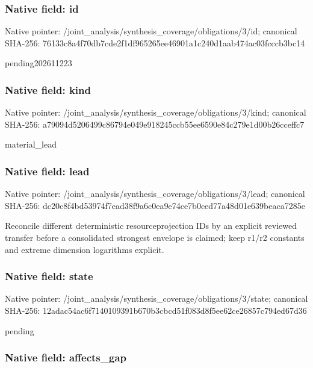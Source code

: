 \documentclass[10pt,a4paper]{article}
\begin{document}
\subsubsection{Native field: id}


Native pointer: /joint\_analysis/synthesi\allowbreak{}s\_coverage/obligations/3\allowbreak{}/id; canonical SHA-256: 76133c8a4f70db7cde2f1df9\allowbreak{}65265ee46901a1c240d1aab4\allowbreak{}74ac03fcccb3bc14


pending202611223


\subsubsection{Native field: kind}


Native pointer: /joint\_analysis/synthesi\allowbreak{}s\_coverage/obligations/3\allowbreak{}/kind; canonical SHA-256: a79094d5206499c86794e049\allowbreak{}e918245ccb55ee6590e84c27\allowbreak{}9e1d00b26cceffc7


material\_lead


\subsubsection{Native field: lead}


Native pointer: /joint\_analysis/synthesi\allowbreak{}s\_coverage/obligations/3\allowbreak{}/lead; canonical SHA-256: dc20c8f4bd53974f7ead38f9\allowbreak{}a6c0ea9e74ce7b0ced77a48d\allowbreak{}01e639beaca7285e


Reconcile different deterministic resourceprojection IDs by an explicit reviewed transfer before a consolidated strongest envelope is claimed; keep r1/r2 constants and extreme dimension logarithms explicit.


\subsubsection{Native field: state}


Native pointer: /joint\_analysis/synthesi\allowbreak{}s\_coverage/obligations/3\allowbreak{}/state; canonical SHA-256: 12adac54ac6f7140109391b6\allowbreak{}70b3cbcd51f083d8f5ee62ce\allowbreak{}26857c794ed67d36


pending


\subsubsection{Native field: affects\_gap}
\end{document}
